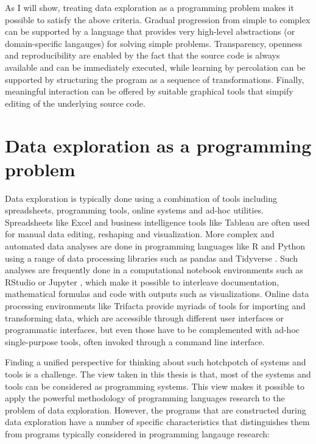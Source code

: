 \documentclass[fleqn,11pt]{report}
\theoremstyle{definition}
\begin{document}
As I will show, treating data exploration as a programming problem makes it possible to satisfy
the above criteria. Gradual progression from simple to complex can be supported by a language
that provides very high-level abstractions (or domain-specific langauges) for solving simple
problems. Transparency, openness and reproducibility are enabled by the fact that the source code
is always available and can be immediately executed, while learning
by percolation can be supported by structuring the program as a sequence of transformations.
Finally, meaningful interaction can be offered by suitable graphical tools that simpify editing
of the underlying source code.

\section{Data exploration as a programming problem}

Data exploration is typically done using a combination of tools including spreadsheets,
programming tools, online systems and ad-hoc utilities. Spreadsheets like Excel and business
intelligence tools like Tableau \citep{wesley-2011-tableau} are often used for manual data
editing, reshaping and visualization. More complex and automated data analyses are done in
programming languages like R and Python using a range of data processing libraries such as pandas
and Tidyverse \citep{wickham-2019-tidyverse}. Such analyses are frequently done in a computational
notebook environments such as RStudio or Jupyter \citep{kluyver-2016-jupyter}, which make
it possible to interleave documentation, mathematical formulas and code with outputs such as
visualizations. Online data processing environments like Trifacta provide myriads of tools for
importing and transforming data, which are accessible through different user interfaces or
programmatic interfaces, but even those have to be complemented with ad-hoc single-purpose tools,
often invoked through a command line interface.

Finding a unified perspective for thinking about such hotchpotch of systems and tools
is a challenge. The view taken in this thesis is that, most of the systems and tools can be
considered as programming systems. This view makes it possible to apply the powerful methodology
of programming languages research to the problem of data exploration.
However, the programs that are constructed during data exploration have a number of specific
characteristics that distinguishes them from programs typically considered in programming
langauge research:
\end{document}
